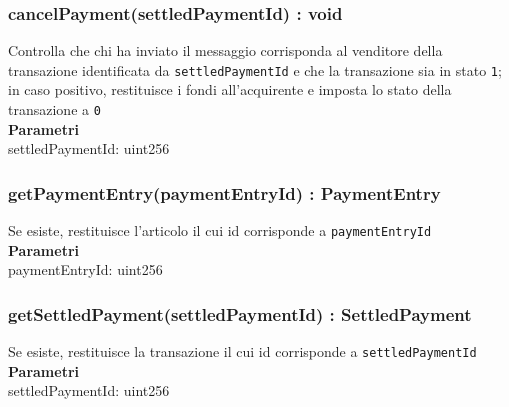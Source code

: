 \documentclass[a4paper, 12pt]{article}
\begin{document}
\subsubsection{cancelPayment(settledPaymentId) : void}
Controlla che chi ha inviato il messaggio corrisponda al venditore della transazione identificata da \texttt{settledPaymentId} e che la transazione sia in stato \texttt{1}; in caso positivo, restituisce i fondi all'acquirente e imposta lo stato della transazione a \texttt{0}\\
\textbf{Parametri}\\
settledPaymentId: uint256
\subsubsection{getPaymentEntry(paymentEntryId) : PaymentEntry}
Se esiste, restituisce l'articolo il cui id corrisponde a \texttt{paymentEntryId}\\
\textbf{Parametri}\\
paymentEntryId: uint256
\subsubsection{getSettledPayment(settledPaymentId) : SettledPayment}
Se esiste, restituisce la transazione il cui id corrisponde a \texttt{settledPaymentId}\\
\textbf{Parametri}\\
settledPaymentId: uint256
\end{document}
